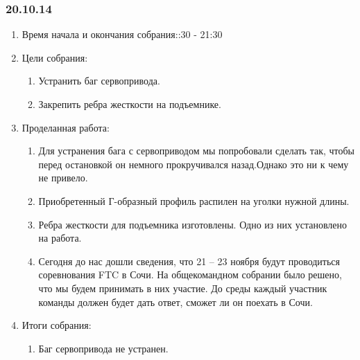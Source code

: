 	
\subsubsection{20.10.14}

\begin{enumerate}
	\item Время начала и окончания собрания::30 - 21:30
	\item Цели собрания:\newline
	\begin{enumerate}
	  \item Устранить баг сервопривода.\newline
	  
	  \item Закрепить ребра жесткости на подъемнике.\newline
	  
    \end{enumerate}
    
	\item Проделанная работа:\newline
	\begin{enumerate}
	  \item Для устранения бага с сервоприводом мы попробовали сделать так, чтобы перед остановкой он немного прокручивался назад.Однако это ни к чему не привело.\newline
      
      \item Приобретенный Г-образный профиль распилен на уголки нужной длины.\newline
      
      \item Ребра жесткости для подъемника изготовлены. Одно из них установлено на работа.\newline
      
      \item Сегодня до нас дошли сведения, что 21 – 23 ноября будут проводиться соревнования FTC в Сочи. На общекомандном собрании было решено, что мы будем принимать в них участие. До среды каждый участник команды должен будет дать ответ, сможет ли он поехать в Сочи.\newline
      
    \end{enumerate}
    
	\item Итоги собрания: \newline
	\begin{enumerate}
	  \item Баг сервопривода не устранен.\newline
	  

\end{enumerate}
\end{enumerate}
